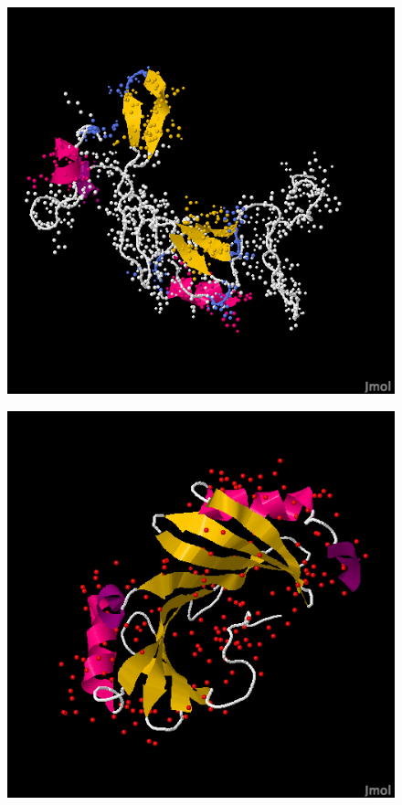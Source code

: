 \documentclass{article}
\begin{document}
\begin{enumerate}
\begin{figure}
\centering
\begin{minipage}{.5\textwidth}
  \centering
  \includegraphics[width=.9\linewidth]{target_group_v2}
  \label{fig:test1}
\end{minipage}%
\begin{minipage}{.5\textwidth}
  \centering
  \includegraphics[width=.9\linewidth]{target_native}
  \label{fig:test2}
\end{minipage}
\end{figure}


\end{enumerate}
\end{document}
